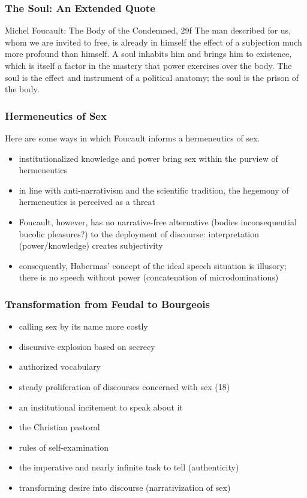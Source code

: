 \documentclass[xcolor=dvipsnames]{beamer}
\begin{document}
\begin{frame}
  \frametitle{The Soul: An Extended Quote}
  \begin{block}{Michel Foucault: The Body of the Condemned, 29f}
    The man described for us, whom we are invited to free, is already
    in himself the effect of a subjection much more profound than
    himself. A soul inhabits him and brings him to existence, which is
    itself a factor in the mastery that power exercises over the body.
    The soul is the effect and instrument of a political anatomy; the
    soul is the prison of the body.
  \end{block}
\end{frame}

\begin{frame}
  \frametitle{Hermeneutics of Sex}
  Here are some ways in which Foucault informs a hermeneutics of sex.
  \begin{itemize}
  \item institutionalized knowledge and power bring sex within the
    purview of hermeneutics
  \item in line with anti-narrativism and the scientific tradition,
    the hegemony of hermeneutics is perceived as a threat
  \item Foucault, however, has no narrative-free alternative (bodies
    inconsequential bucolic pleasures?) to the deployment of
    discourse: interpretation (power/knowledge) creates subjectivity
  \item consequently, Habermas' concept of the ideal speech situation
    is illusory; there is no speech without power (concatenation of
    microdominations)
  \end{itemize}
\end{frame}

\begin{frame}
  \frametitle{Transformation from Feudal to Bourgeois}
  \begin{itemize}
  \item calling sex by its name more costly
  \item discursive explosion based on secrecy
  \item authorized vocabulary
  \item steady proliferation of discourses concerned with sex (18)
  \item an institutional incitement to speak about it
  \item the Christian pastoral
  \item rules of self-examination
  \item the imperative and nearly infinite task to tell (authenticity)
  \item transforming desire into discourse (narrativization of sex)
  \end{itemize}
\end{frame}
\end{document}
